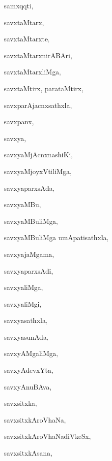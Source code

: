 \begin{multicols}{3}
{\noindent
{samxqqti}, \pageref{samxqqti}

\noindent
{savxtaMtarx}, \pageref{savxtaMtarx}

\noindent
{savxtaMtarxte}, \pageref{savxtaMtarxte}

\noindent
{savxtaMtarxnirABAri}, \pageref{savxtaMtarxnirABAri}

\noindent
{savxtaMtarxliMga}, \pageref{savxtaMtarxliMga}

\noindent
{savxtaMtirx, parataMtirx}, \pageref{savxtaMtirx, parataMtirx}

\noindent
{savxparAjacnxsathxla}, \pageref{savxparAjacnxsathxla}

\noindent
{savxpanx}, \pageref{savxpanx}

\noindent
{savxya}, \pageref{savxya}

\noindent
{savxyaMjAcnxnashiKi}, \pageref{savxyaMjAcnxnashiKi}

\noindent
{savxyaMjoyxVtiliMga}, \pageref{savxyaMjoyxVtiliMga}

\noindent
{savxyaparxsAda}, \pageref{savxyaparxsAda}

\noindent
{savxyaMBu}, \pageref{savxyaMBu}

\noindent
{savxyaMBuliMga}, \pageref{savxyaMBuliMga}

\noindent
{savxyaMBuliMga umApatisathxla}, \pageref{savxyaMBuliMgaumApatisathxla}

\noindent
{savxyajaMgama}, \pageref{savxyajaMgama}

\noindent
{savxyaparxsAdi}, \pageref{savxyaparxsAdi}

\noindent
{savxyaliMga}, \pageref{savxyaliMga}

\noindent
{savxyaliMgi}, \pageref{savxyaliMgi}

\noindent
{savxyasathxla}, \pageref{savxyasathxla}

\noindent
{savxyasunAda}, \pageref{savxyasunAda}

\noindent
{savxyAMgaliMga}, \pageref{savxyAMgaliMga}

\noindent
{savxyAdevxYta}, \pageref{savxyAdevxYta}

\noindent
{savxyAnuBAva}, \pageref{savxyAnuBAva}

\noindent
{savxsitxka}, \pageref{savxsitxka}

\noindent
{savxsitxkAroVhaNa}, \pageref{savxsitxkAroVhaNa}

\noindent
{savxsitxkAroVhaNadiVkeSx}, \pageref{savxsitxkAroVhaNadiVkeSx}

\noindent
{savxsitxkAsana}, \pageref{savxsitxkAsana}

}
\end{multicols}

